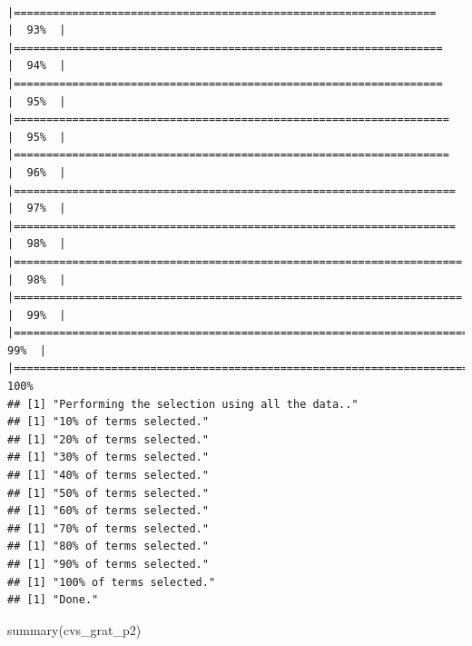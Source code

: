 \documentclass[
]{article}
\newenvironment{Shaded}{\begin{snugshade}}{\end{snugshade}}
\newcommand{\FunctionTok}[1]{\textcolor[rgb]{0.00,0.00,0.00}{#1}}
\newcommand{\NormalTok}[1]{#1}
\begin{document}
\begin{verbatim}
          |=================================================================     |  93%  |                                                                              |==================================================================    |  94%  |                                                                              |==================================================================    |  95%  |                                                                              |===================================================================   |  95%  |                                                                              |===================================================================   |  96%  |                                                                              |====================================================================  |  97%  |                                                                              |====================================================================  |  98%  |                                                                              |===================================================================== |  98%  |                                                                              |===================================================================== |  99%  |                                                                              |======================================================================|  99%  |                                                                              |======================================================================| 100%
## [1] "Performing the selection using all the data.."
## [1] "10% of terms selected."
## [1] "20% of terms selected."
## [1] "30% of terms selected."
## [1] "40% of terms selected."
## [1] "50% of terms selected."
## [1] "60% of terms selected."
## [1] "70% of terms selected."
## [1] "80% of terms selected."
## [1] "90% of terms selected."
## [1] "100% of terms selected."
## [1] "Done."
\end{verbatim}

\begin{Shaded}
\begin{Highlighting}[]
\FunctionTok{summary}\NormalTok{(cvs\_grat\_p2)}
\end{Highlighting}
\end{Shaded}
\end{document}
